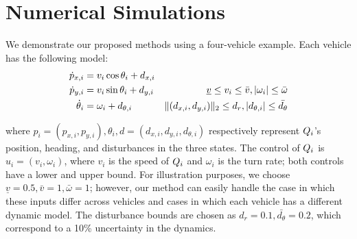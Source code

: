 \section{Numerical Simulations \label{sec:sim}}
We demonstrate our proposed methods using a four-vehicle example. Each vehicle has the following model:
\vspace{-0.2em}
\begin{equation}
\label{eq:dyn_i}
\begin{aligned}
\dot{p}_{x,i} &= v_i \cos \theta_i + d_{x,i} &\\
\dot{p}_{y,i} &= v_i \sin \theta_i + d_{y,i} & \underline{v} \le v_i \le \bar{v}, |\omega_i| \le \bar{\omega}\\
\dot{\theta}_i &= \omega_i + d_{\theta,i} & \|(d_{x,i}, d_{y,i}) \|_2 \le d_{r}, |d_{\theta,i}| \le \bar{d_{\theta}}\\
\end{aligned}
\end{equation}

\noindent where $p_i = (p_{x,i}, p_{y,i}), \theta_i, d = (d_{x,i}, d_{y,i}, d_{\theta,i})$ respectively represent $Q_i$'s position, heading, and disturbances in the three states. The control of $Q_i$ is $u_i = (v_i, \omega_i)$, where $v_i$ is the speed of $Q_i$ and $\omega_i$ is the turn rate; both controls have a lower and upper bound. For illustration purposes, we choose $\underline{v} = 0.5, \bar{v} = 1, \bar\omega = 1$; however, our method can easily handle the case in which these inputs differ across vehicles and cases in which each vehicle has a different dynamic model. The disturbance bounds are chosen as $d_{r} = 0.1, \bar{d_{\theta}} = 0.2$, which correspond to a 10\% uncertainty in the dynamics. %

%

